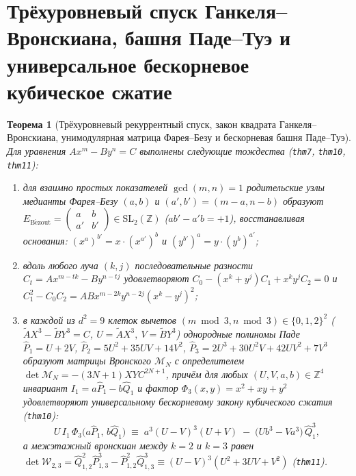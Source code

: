 \documentclass[11pt,a4paper]{article}
\theoremstyle{plain}
\newtheorem{theorem}{Теорема}[section]
\theoremstyle{definition}
\begin{document}
\section{Трёхуровневый спуск Ганкеля--Вронскиана, башня Паде--Туэ и универсальное бескорневое кубическое сжатие}
\label{sec:pade-thue}

\begin{theorem}[Трёхуровневый рекуррентный спуск, закон квадрата Ганкеля--Вронскиана, унимодулярная матрица Фарея--Безу и бескорневая башня Паде--Туэ]
\label{thm:main-7}
Для уравнения $A x^m - B y^n = C$ выполнены следующие тождества (\texttt{thm7}, \texttt{thm10}, \texttt{thm11}):
\begin{enumerate}[label=\textbf{(\roman*)},leftmargin=*]
\item для взаимно простых показателей $\gcd(m,n)=1$ родительские узлы медианты Фарея--Безу $(a,b)$ и $(a',b') = (m-a,n-b)$ образуют $E_{\mathrm{B\acute{e}zout}} = \begin{pmatrix} a & b \\ a' & b' \end{pmatrix}\in\mathrm{SL}_2(\mathbb{Z})$ ($a b' - a' b = +1$), восстанавливая основания: $(x^a)^{b'} = x\cdot (x^{a'})^b$ и $(y^{b'})^a = y\cdot (y^b)^{a'}$;
\item вдоль любого луча $(k,j)$ последовательные разности $C_t = A x^{m-tk} - B y^{n-tj}$ удовлетворяют $C_0 - (x^k+y^j)C_1 + x^k y^j C_2 = 0$ и $C_1^2 - C_0 C_2 = A B x^{m-2k}y^{n-2j}(x^k-y^j)^2$;
\item в каждой из $d^2=9$ клеток вычетов $(m\bmod 3,n\bmod 3)\in\{0,1,2\}^2$ ($\widetilde{A} X^3 - \widetilde{B} Y^3 = C$, $U = \widetilde{A} X^3,\ V = \widetilde{B} Y^3$) однородные полиномы Паде $\widehat{P}_1 = U + 2V$, $\widehat{P}_2 = 5U^2 + 35UV + 14V^2$, $\widehat{P}_3 = 2U^3 + 30U^2V + 42UV^2 + 7V^3$ образуют матрицы Вронского $\mathcal{M}_N$ с определителем $\det\mathcal{M}_N = -(3N+1) X Y C^{2N+1}$, причём для любых $(U,V,a,b)\in\mathbb{Z}^4$ инвариант $I_1 = a\widehat{P}_1 - b\widehat{Q}_1$ и фактор $\Phi_3(x,y) = x^2 + xy + y^2$ удовлетворяют универсальному бескорневому закону кубического сжатия (\texttt{thm10}):
  \begin{equation}
    \label{eq:root-free-cubic-compression}
    U\,I_1\,\Phi_3\bigl(a\widehat{P}_1,\,b\widehat{Q}_1\bigr) \;\equiv\; a^3(U-V)^3(U+V) \;-\; \bigl(U b^3 - V a^3\bigr)\,\widehat{Q}_1^3,
  \end{equation}
  а межэтажный вронскиан между $k=2$ и $k=3$ равен $\det\mathcal{W}_{2,3} = \widehat{Q}_{1,2}^2\widehat{P}_{1,3}^3 - \widehat{P}_{1,2}^2\widehat{Q}_{1,3}^3 \equiv (U - V)^3(U^2 + 3UV + V^2)$ (\texttt{thm11}).
\end{enumerate}
\end{theorem}
\end{document}
